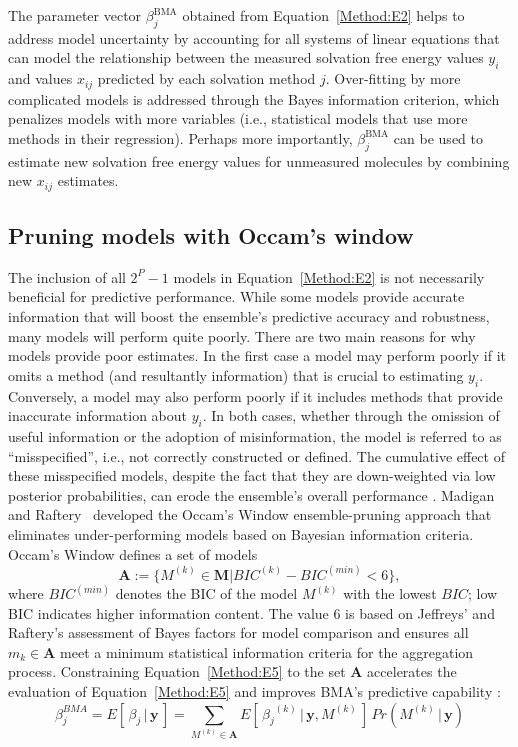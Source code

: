 \documentclass[journal=jpcbfk, manuscript=article]{achemso}
\newcommand{\+}[1]{\ensuremath{\mathbf{#1}}}
\begin{document}
The parameter vector $\beta_j^{\text{BMA}}$ obtained from Equation~\ref{Method:E2} helps to address model uncertainty by accounting for all systems of linear equations that can model the relationship between the measured solvation free energy values $y_i$ and values $x_{ij}$ predicted by each solvation method $j$.
Over-fitting by more complicated models is addressed through the Bayes information criterion, which penalizes models with more variables (i.e., statistical models that use more methods in their regression).
Perhaps more importantly, $\beta_j^{\text{BMA}}$ can be used to estimate new solvation free energy values for unmeasured molecules by combining new $x_{i j}$ estimates.

\subsection{Pruning models with Occam's window} \label{Method:StatEnsemble}

The inclusion of all $2^P-1$ models in Equation~\ref{Method:E2} is not necessarily beneficial for predictive performance.
While some models provide accurate information that will boost the ensemble's predictive accuracy and robustness, many models will perform quite poorly.
There are two main reasons for why models provide poor estimates.
In the first case a model may perform poorly if it omits a method (and resultantly information) that is crucial to estimating $y_i$.
Conversely, a model may also perform poorly if it includes methods that provide inaccurate information about $y_i$.
In both cases, whether through the omission of useful information or the adoption of misinformation, the model is referred to as ``misspecified'', i.e., not correctly constructed or defined.
The cumulative effect of these misspecified models, despite the fact that they are down-weighted via low posterior probabilities, can erode the ensemble's overall performance \cite{Qian:2015, Martinez-Munoz:2009, Raftery:1998, Onorante:2014, Madigan:1994, Hoeting:1999, Morales-Casique:2010}.
Madigan and Raftery~\cite{Madigan:1994} developed the Occam's Window ensemble-pruning approach that eliminates under-performing models based on Bayesian information criteria.
Occam's Window defines a set of models
\begin{equation} \label{Method:E5}
	\textbf{A} := \{M^{(k)} \in \textbf{M} | BIC^{(k)} - BIC^{(min)} < 6\},
\end{equation}
where $BIC^{(min)}$ denotes the BIC of the model $M^{(k)}$ with the lowest $BIC$; low BIC indicates higher information content.
The value 6 is based on Jeffreys' \cite{Jefferys:1961} and Raftery's \cite{Raftery:1995} assessment of Bayes factors for model comparison and ensures all $m_k \in \mathbf{A}$ meet a minimum statistical information criteria for the aggregation process.
Constraining Equation~\ref{Method:E5} to the set $\+A$ accelerates the evaluation of Equation~\ref{Method:E5} and improves BMA's predictive capability \cite{Raftery:1998, Madigan:1994}:
\begin{equation} \label{Method:E6}
	\beta^{BMA}_j =  E[\,\beta_j \,|\, \+y\,] = \sum_{M^{(k)}\in \mathbf{A}} E[\,{\beta_j}^{(k)} \,|\, \+y,M^{(k)}\,] \,Pr(M^{(k)} \,|\, \textbf{y})
\end{equation}
\end{document}
